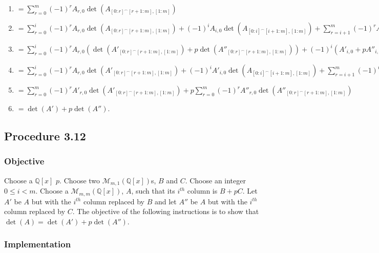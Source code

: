 \documentclass[twocolumn]{article}
\newcommand{\procedure}[2][]{\subsection*{Procedure #2 \ifthenelse{\equal{#1}{}}{}{(#1)}}\label{sec:procedure #2}}
\newcommand{\objective}{\subsubsection*{Objective}}
\newcommand{\implementation}{\subsubsection*{Implementation}}
\begin{document}
\begin{enumerate}
\begin{enumerate}
						\begin{enumerate}
							\item $=\sum_{r=0}^m (-1)^rA_{r,0}\det(A_{[0:r]^\frown[r+1:m],[1:m]})$
							\item $=\sum_{r=0}^i (-1)^rA_{r,0}\det(A_{[0:r]^\frown[r+1:m],[1:m]})+(-1)^iA_{i,0}\det(A_{[0:i]^\frown[i+1:m],[1:m]})+\sum_{r=i+1}^m (-1)^rA_{r,0}\det(A_{[0:r]^\frown[r+1:m],[1:m]})$
							\item $=\sum_{r=0}^i (-1)^rA_{r,0}(\det(A'_{[0:r]^\frown[r+1:m],[1:m]})+p\det(A''_{[0:r]^\frown[r+1:m],[1:m]}))+(-1)^i(A'_{i,0}+pA''_{i,0})\det(A_{[0:i]^\frown[i+1:m],[1:m]})+\sum_{r=i+1}^m (-1)^rA_{r,0}(\det(A'_{[0:r]^\frown[r+1:m],[1:m]})+p\det(A''_{[0:r]^\frown[r+1:m],[1:m]}))$
							\item $=\sum_{r=0}^i (-1)^rA_{r,0}\det(A'_{[0:r]^\frown[r+1:m],[1:m]})+(-1)^iA'_{i,0}\det(A_{[0:i]^\frown[i+1:m],[1:m]})+\sum_{r=i+1}^m (-1)^rA_{r,0}\det(A'_{[0:r]^\frown[r+1:m],[1:m]})
								+\sum_{r=0}^i (-1)^rA_{r,0}p\det(A''_{[0:r]^\frown[r+1:m],[1:m]})+(-1)^ipA''_{i,0}\det(A_{[0:i]^\frown[i+1:m],[1:m]})+\sum_{r=i+1}^m (-1)^rA_{r,0}p\det(A''_{[0:r]^\frown[r+1:m],[1:m]})$
							\item $=\sum_{r=0}^m (-1)^rA'_{r,0}\det(A'_{[0:r]^\frown[r+1:m],[1:m]})+p\sum_{r=0}^m (-1)^rA''_{r,0}\det(A''_{[0:r]^\frown[r+1:m],[1:m]})$
							\item $=\det(A')+p\det(A'')$.
						\end{enumerate}
					\end{enumerate}
				\end{enumerate}
		\procedure{3.12}
			\objective
				Choose a $\mathbb{Q}[x]$ $p$. Choose two $\mathcal{M}_{m,1}(\mathbb{Q}[x])$s, $B$ and $C$. Choose an integer $0\le i<m$. Choose a $\mathcal{M}_{m,m}(\mathbb{Q}[x])$, $A$, such that its $i^{th}$ column is $B+pC$. Let $A'$ be $A$ but with the $i^{th}$ column replaced by $B$ and let $A''$ be $A$ but with the $i^{th}$ column replaced by $C$. The objective of the following instructions is to show that $\det(A)=\det(A')+p\det(A'')$.
			\implementation
\end{document}
